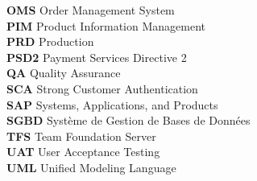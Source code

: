 \begin{tabbing}
    \textbf{OMS} \> Order Management System \\

    \textbf{PIM} \> Product Information Management \\

    \textbf{PRD} \> Production \\

    \textbf{PSD2} \> Payment Services Directive 2 \\

    \textbf{QA} \> Quality Assurance \\

    \textbf{SCA} \> Strong Customer Authentication \\

    \textbf{SAP} \> Systems, Applications, and Products \\

    \textbf{SGBD} \> Système de Gestion de Bases de Données \\

    \textbf{TFS} \> Team Foundation Server \\

    \textbf{UAT} \> User Acceptance Testing \\

    \textbf{UML} \> Unified Modeling Language \\


\end{tabbing}
